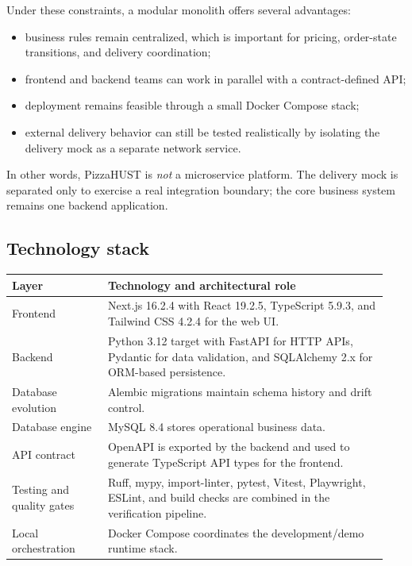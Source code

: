 Under these constraints, a modular monolith offers several advantages:

\begin{itemize}
    \item business rules remain centralized, which is important for pricing, order-state transitions, and delivery coordination;
    \item frontend and backend teams can work in parallel with a contract-defined API;
    \item deployment remains feasible through a small Docker Compose stack;
    \item external delivery behavior can still be tested realistically by isolating the delivery mock as a separate network service.
\end{itemize}

In other words, PizzaHUST is \emph{not} a microservice platform. The delivery mock is separated only to exercise a real integration boundary; the core business system remains one backend application.

\subsection{Technology stack}

\begingroup
\small
\setlength{\LTpre}{0.4em}
\setlength{\LTpost}{0.8em}
\label{tab:technology-stack}
\begin{tabular}{L{0.24\linewidth} L{0.70\linewidth}}
\toprule
\textbf{Layer} & \textbf{Technology and architectural role} \\
\midrule
Frontend & Next.js 16.2.4 with React 19.2.5, TypeScript 5.9.3, and Tailwind CSS 4.2.4 for the web UI. \\
Backend & Python 3.12 target with FastAPI for HTTP APIs, Pydantic for data validation, and SQLAlchemy 2.x for ORM-based persistence. \\
Database evolution & Alembic migrations maintain schema history and drift control. \\
Database engine & MySQL 8.4 stores operational business data. \\
API contract & OpenAPI is exported by the backend and used to generate TypeScript API types for the frontend. \\
Testing and quality gates & Ruff, mypy, import-linter, pytest, Vitest, Playwright, ESLint, and build checks are combined in the verification pipeline. \\
Local orchestration & Docker Compose coordinates the development/demo runtime stack. \\
\bottomrule
\end{tabular}
\endgroup

